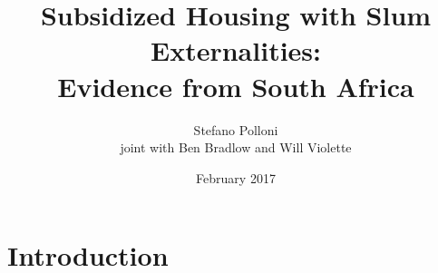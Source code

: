 \documentclass[aspectratio=149]{beamer}
\title{ Subsidized Housing with Slum Externalities: \\ Evidence from South Africa } %
\author{Stefano Polloni \\
joint with Ben Bradlow and Will Violette}
\date{February 2017} %
\begin{document}
\beamertemplatenavigationsymbolsempty

\begin{frame}
\titlepage %
\end{frame}




%




\section{Introduction}
\end{document}
